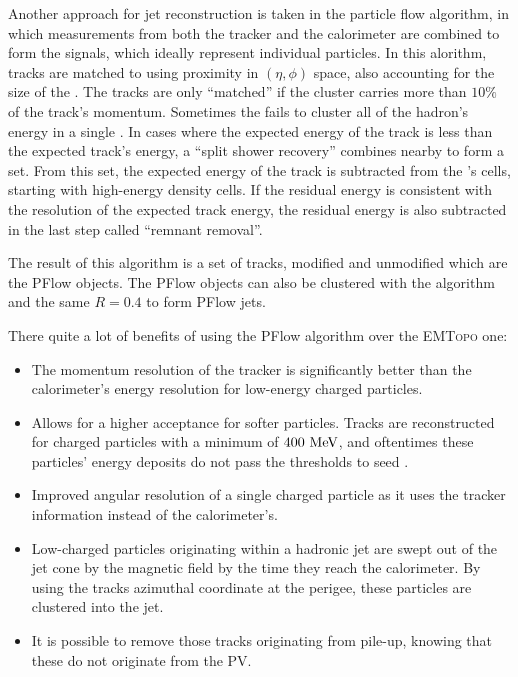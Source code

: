Another approach for jet reconstruction is taken in the particle flow algorithm, in which measurements from both the tracker and the calorimeter are combined to form the signals, which ideally represent individual particles.
In this alorithm, tracks are matched to \topos using proximity in \((\eta,\phi)\) space, also accounting for the size of the \topo. The tracks are only “matched” if the cluster carries more than \(10\%\) of the track's momentum. Sometimes the \topo fails to cluster all of the hadron's energy in a single \topo. In cases where the expected energy of the track is less than the expected track's energy, a “split shower recovery” combines nearby \topos to form a \topo set. From this \topo set, the expected energy of the track is subtracted from the \topo's cells, starting with high-energy density cells. If the residual energy is consistent with the resolution of the expected track energy, the residual energy is also subtracted in the last step called “remnant removal”.

The result of this algorithm is a set of tracks, modified and unmodified \topos which are the \ac{PFlow} objects. The \ac{PFlow} objects can also be clustered with the \antikt algorithm and the same \(R=0.4\) to form \ac{PFlow} jets.

There quite a lot of benefits of using the \ac{PFlow} algorithm over the \textsc{EMTopo} one:
\begin{itemize}
    \item The momentum resolution of the tracker is significantly better than the calorimeter's energy resolution for low-energy charged particles.
    \item Allows for a higher acceptance for softer particles. Tracks are reconstructed for charged particles with a minimum \pt of \(400~\text{MeV}\), and oftentimes these particles' energy deposits do not pass the thresholds to seed \topos.
    \item Improved angular resolution of a single charged particle as it uses the tracker information instead of the calorimeter's.
    \item Low-\pt charged particles originating within a hadronic jet are swept out of the jet cone by the magnetic field by the time they reach the calorimeter. By using the tracks azimuthal coordinate at the perigee, these particles are clustered into the jet.
    \item It is possible to remove those tracks originating from pile-up, knowing that these do not originate from the \ac{PV}.
\end{itemize}


